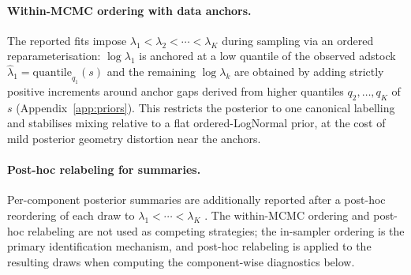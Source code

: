 \documentclass[11pt]{article}
\begin{document}
\paragraph{Within-MCMC ordering with data anchors.} The reported fits impose $\lambda_1 < \lambda_2 < \cdots < \lambda_K$ during sampling via an ordered reparameterisation: $\log \lambda_1$ is anchored at a low quantile of the observed adstock $\hat\lambda_1 = \text{quantile}_{q_1}(s)$ and the remaining $\log \lambda_k$ are obtained by adding strictly positive increments around anchor gaps derived from higher quantiles $q_2, \ldots, q_K$ of $s$ (Appendix~\ref{app:priors}). This restricts the posterior to one canonical labelling and stabilises mixing relative to a flat ordered-LogNormal prior, at the cost of mild posterior geometry distortion near the anchors.

\paragraph{Post-hoc relabeling for summaries.} Per-component posterior summaries are additionally reported after a post-hoc reordering of each draw to $\lambda_1 < \cdots < \lambda_K$ \citep{stephens2000label, papastamoulis2014label}. The within-MCMC ordering and post-hoc relabeling are not used as competing strategies; the in-sampler ordering is the primary identification mechanism, and post-hoc relabeling is applied to the resulting draws when computing the component-wise diagnostics below.
\end{document}
